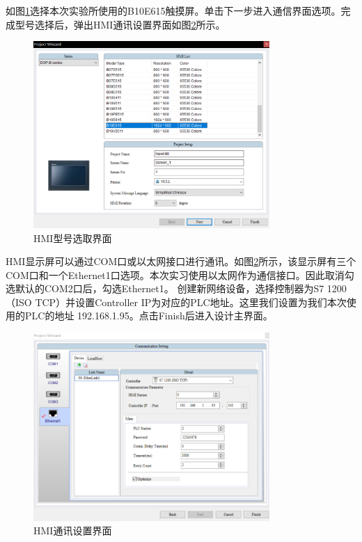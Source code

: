 \documentclass[UTF8]{article}
\begin{document}
如图\ref{fig:img2}选择本次实验所使用的B10E615触摸屏。单击下一步进入通信界面选项。完成型号选择后，弹出HMI通讯设置界面如图\ref{fig:img3}所示。
\begin{figure}[H]
    \centering %
    \includegraphics[width=0.8\textwidth]{figure/HMI型号选取界面.png} 
    \caption{HMI型号选取界面} %
    \label{fig:img2} %
\end{figure}

HMI显示屏可以通过COM口或以太网接口进行通讯。如图\ref{fig:img3}所示，该显示屏有三个COM口和一个Ethernet1口选项。本次实习使用以太网作为通信接口。因此取消勾选默认的COM2口后，勾选Ethernet1。
创建新网络设备，选择控制器为S7 1200（ISO TCP）并设置Controller IP为对应的PLC地址。这里我们设置为我们本次使用的PLC的地址 192.168.1.95。点击Finish后进入设计主界面。
\begin{figure}[H]
    \centering %
    \includegraphics[width=0.8\textwidth]{figure/HMI通讯设置界面.png} 
    \caption{HMI通讯设置界面} %
    \label{fig:img3} %
\end{figure}
\end{document}

